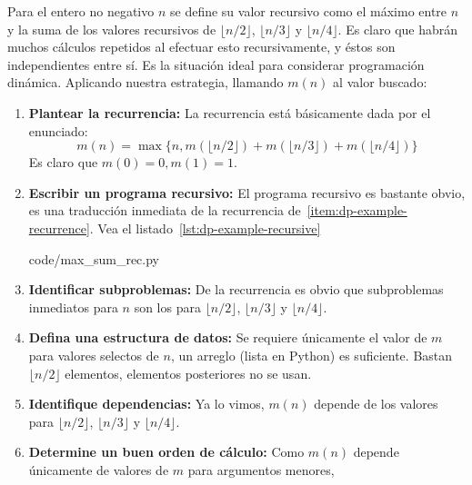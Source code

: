   Para el entero no negativo \(n\) se define su valor recursivo
  como el máximo entre \(n\)
  y la suma de los valores recursivos
  de \(\lfloor n / 2 \rfloor\),
  \(\lfloor n / 3 \rfloor\) y \(\lfloor n / 4 \rfloor\).
  Es claro que habrán muchos cálculos repetidos al efectuar esto recursivamente,
  y éstos son independientes entre sí.
  Es la situación ideal para considerar programación dinámica.
  Aplicando nuestra estrategia,
  llamando \(m(n)\) al valor buscado:
  \begin{enumerate}[label = {(\alph*)}]
  \item \textbf{Plantear la recurrencia:}
    \label{item:dp-example-recurrence}
    La recurrencia está básicamente dada por el enunciado:
    \begin{equation*}
      m(n)
	= \max \{
		   n,
		   m(\lfloor n / 2 \rfloor)
		     + m(\lfloor n / 3 \rfloor)
		     + m(\lfloor n / 4 \rfloor)
	       \}
    \end{equation*}
    Es claro que \(m(0) = 0, m(1) = 1\).
  \item \textbf{Escribir un programa recursivo:}
    \label{item:dp-example-recursive-program}
    El programa recursivo es bastante obvio,
    es una traducción inmediata
    de la recurrencia de~\ref{item:dp-example-recurrence}.
    Vea el listado~\ref{lst:dp-example-recursive}
    
		    {code/max_sum_rec.py}
  \item \textbf{Identificar subproblemas:}
    \label{item:dp-example-subproblems}
    De la recurrencia es obvio que subproblemas inmediatos para \(n\)
    son los para \(\lfloor n / 2 \rfloor\),
     \(\lfloor n / 3 \rfloor\) y \(\lfloor n / 4 \rfloor\).
  \item \textbf{Defina una estructura de datos:}
    \label{item:dp-example-data-structure}
    Se requiere únicamente el valor de \(m\) para valores selectos de \(n\),
    un arreglo
    (lista en Python)
    es suficiente.
    Bastan \(\lfloor n / 2 \rfloor\) elementos,
    elementos posteriores no se usan.
  \item \textbf{Identifique dependencias:}
    \label{item:dp-example-dependencies}
    Ya lo vimos, \(m(n)\)
    depende de los valores para \(\lfloor n / 2 \rfloor\),
     \(\lfloor n / 3 \rfloor\) y \(\lfloor n / 4 \rfloor\).
  \item \textbf{Determine un buen orden de cálculo:}
    \label{item:dp-example-order}
    Como \(m(n)\)
    depende únicamente de valores de \(m\) para argumentos menores,

\end{enumerate}
